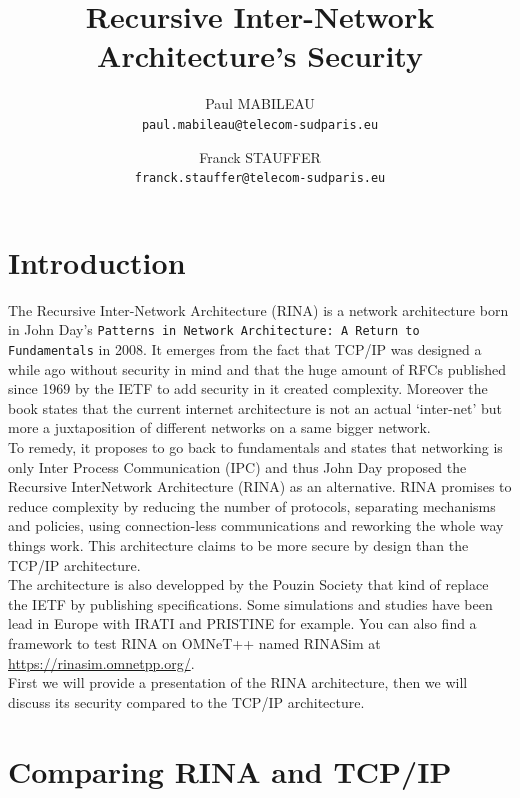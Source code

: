\documentclass[a4paper]{proc}
\author{Paul MABILEAU\\\texttt{paul.mabileau@telecom-sudparis.eu} \and Franck STAUFFER\\\texttt{franck.stauffer@telecom-sudparis.eu}}
\title{\textbf{Recursive Inter-Network Architecture's Security}}
\begin{document}
\maketitle
\tableofcontents
\newpage
\part{Introduction}
The Recursive Inter-Network Architecture (RINA) is a network architecture born in John Day's \texttt{Patterns in Network Architecture: A Return to Fundamentals} in 2008.
It emerges from the fact that TCP/IP was designed a while ago without security in mind and that the huge amount of RFCs\cite{rfc} published since 1969 by the IETF to add security in it created complexity.\cite{assessing-security}
Moreover the book states that the current internet architecture is not an actual `inter-net' but more a juxtaposition of different networks on a same bigger network.
\\To remedy, it proposes to go back to fundamentals and states that networking is only Inter Process Communication (IPC) and thus John Day proposed the Recursive InterNetwork Architecture (RINA) as an alternative.
RINA promises to reduce complexity by reducing the number of protocols, separating mechanisms and policies, using connection-less communications and reworking the whole way things work.
This architecture claims to be more secure by design than the TCP/IP architecture.
\\The architecture is also developped by the Pouzin Society\cite{psoc} that kind of replace the IETF by publishing specifications.
Some simulations and studies have been lead in Europe with IRATI\cite{web:irati} and PRISTINE\cite{pristine} for example.
You can also find a framework to test RINA on OMNeT++ named RINASim at \url{https://rinasim.omnetpp.org/}.
\\First we will provide a presentation of the RINA architecture, then we will discuss its security compared to the TCP/IP architecture.
\newpage

\part{Comparing RINA and TCP/IP}
\end{document}
